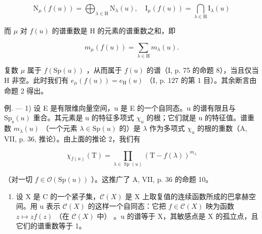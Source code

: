 \[
\mathrm{N} _ {\mu} (f (u)) = \bigoplus_ {\lambda \in \mathrm{H}} \mathrm{N} _ {\lambda} (u), \quad \mathrm{I} _ {\mu} (f (u)) = \bigcap_ {\lambda \in \mathrm{H}} \mathrm{I} _ {\lambda} (u)
\]

而 \(\mu\) 对 \(f(u)\) 的谱重数是 H 的元素的谱重数之和，即

\[
m _ {\mu} (f (u)) = \sum_ {\lambda \in \mathrm{H}} m _ {\lambda} (u).
\]

复数 \(\mu\) 属于 \(f(\mathrm{Sp}(u))\) ，从而属于 \(f(u)\) 的谱（I, p. 75 的命题 8），当且仅当 H 非空。此时我们有 \(e_{\mu}(f(u)) = e_{\mathrm{H}}(u)\) （I, p. 127 的第 1 目）。其余断言由命题 2 得出。

例. --- 1) 设 E 是有限维向量空间，u 是 E 的一个自同态。u 的谱有限且与 \(\mathrm{Sp}_{\mathrm{s}}(u)\) 重合。其元素是 u 的特征多项式 \(\chi_{u}\) 的根；它们就是 u 的特征值。谱重数 \(m_{\lambda}(u)\) （一个元素 \(\lambda \in \mathrm{Sp}(u)\) 的）是 \(\lambda\) 作为多项式 \(\chi_{u}\) 的根的重数（A, VII, p. 36, 推论）。由上面的推论 2，我们有

\[
\chi_ {f (u)} (\mathrm{T}) = \prod_ {\lambda \in \operatorname{Sp} (u)} (\mathrm{T} - f (\lambda)) ^ {m _ {\lambda}}
\]

（对一切 \(f \in \mathcal{O}(\mathrm{Sp}(u))\) ）。这推广了 A, VII, p. 36 的命题 10。

\begin{enumerate}
\def\labelenumi{\arabic{enumi})}
\setcounter{enumi}{1}
\tightlist
\item
  设 X 是 C 的一个紧子集，\(\mathcal{C}(X)\) 是 X 上取复值的连续函数所成的巴拿赫空间。用 u 表示 \(\mathcal{C}(X)\) 的这样一个自同态：它把 \(f \in \mathcal{C}(X)\) 映为函数 \(z \mapsto zf(z)\) （在 \(\mathcal{C}(X)\) 中） 。u 的谱等于 X，其敏感点是 X 的孤立点，且它们的谱重数等于 1。
\end{enumerate}

